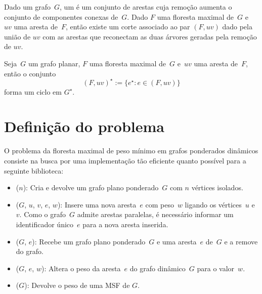 Dado um grafo~$G$, um  é um conjunto de arestas cuja remoção aumenta o conjunto de componentes conexas de~$G$.
Dado $F$ uma floresta maximal de~$G$ e~$uv$ uma aresta de~$F$, então existe um corte associado ao par $(F, uv)$ dado pela união de $uv$ com as arestas que reconectam as duas árvores geradas pela remoção de $uv$.


\begin{theorem}
\label{teo:cutset}
Seja~$G$ um grafo planar, $F$ uma floresta maximal de~$G$ e~$uv$ uma aresta de~$F$, então o conjunto
$$
(F, uv)^\star := \{e^\star:e\in (F, uv)\}
$$
forma um ciclo em $G^\star$.
\end{theorem}


\section{Definição do problema}
\label{sec:definition-MSF}
O problema da floresta maximal de peso mínimo em grafos ponderados dinâmicos consiste na busca por uma implementação tão eficiente quanto possível para a seguinte biblioteca:

\begin{itemize}
\item \MSFCreate($n$): Cria e devolve um grafo plano ponderado~$G$ com $n$ vértices isolados.
\item \MSFaddEdge($G$, $u$, $v$, $e$, $w$): Insere uma nova aresta~$e$ com peso~$w$ ligando os vértices~$u$ e~$v$. Como o grafo~$G$ admite arestas paralelas, é necessário informar um identificador único~$e$ para a nova aresta inserida.
\item \MSFdelEdge($G$, $e$): Recebe um grafo plano ponderado~$G$ e uma aresta~$e$ de~$G$ e a remove do grafo.
\item \MSFupdate($G$, $e$, $w$): Altera o peso da aresta~$e$ do grafo dinâmico~$G$ para o valor~$w$.
\item \MSFweight($G$): Devolve o peso de uma MSF de $G$.
\end{itemize}


